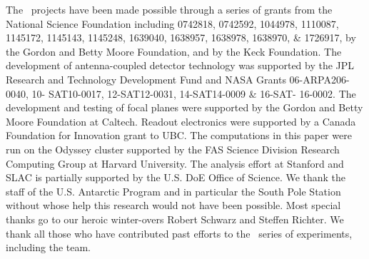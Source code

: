\documentclass[]{spie}
\begin{document}
The \bk\ projects  have  been  made possible through a series of grants from the
National Science  Foundation  including  0742818,  0742592,  1044978, 1110087,
1145172, 1145143, 1145248, 1639040, 1638957, 1638978, 1638970, \& 1726917, by
the Gordon and Betty Moore Foundation, and by the Keck Foundation.  The
development of antenna-coupled detector technology was supported by the JPL
Research and Technology Development Fund and NASA Grants 06-ARPA206-0040, 10-
SAT10-0017, 12-SAT12-0031, 14-SAT14-0009 \& 16-SAT- 16-0002.   The  development
and  testing  of  focal  planes were supported by the Gordon and Betty Moore
Foundation at Caltech.  Readout electronics were supported by a Canada
Foundation for Innovation grant to UBC.  The computations in this paper were
run on the Odyssey cluster supported by the FAS Science Division Research
Computing Group at Harvard University.  The analysis effort at  Stanford  and
SLAC  is  partially  supported  by the  U.S.  DoE  Office of  Science.   We
thank  the  staff  of the U.S. Antarctic Program and in particular the South
Pole Station without whose help this research would not have been possible.
Most special thanks go to our heroic winter-overs  Robert Schwarz  and  Steffen
Richter.   We thank all those who have contributed past efforts to the
\bk\ series of experiments, including the  team.


\clearpage





\end{document}
